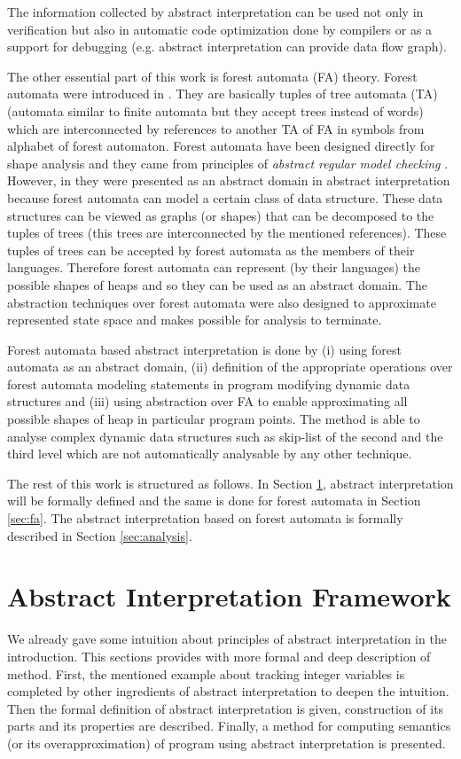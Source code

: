 \documentclass[a4paper, 12pt]{article}
\begin{document}
The information collected by abstract interpretation can be used not only
in verification but also in automatic code optimization done by compilers
or as a support for debugging (e.g. abstract interpretation can provide data flow graph).

The other essential part of this work is forest automata (FA) theory.
Forest automata were introduced in \cite{cav11}.
They are basically tuples of tree automata (TA) (automata similar to finite automata
but they accept trees instead of words) which are interconnected
by references to another TA of FA in symbols from alphabet of forest automaton.
Forest automata have been designed directly for shape analysis and
they came from principles of \emph{abstract regular model checking} \cite{artmc}.
However, in \cite{atva13} they were presented as an abstract domain in abstract interpretation
because forest automata can model a certain class of data structure.
These data structures can be viewed as graphs (or shapes) that can be decomposed to the tuples
of trees (this trees are interconnected by the mentioned references).
These tuples of trees can be accepted by forest automata as the members of their languages.
Therefore forest automata can represent (by their languages) the possible shapes of heaps
and so they can be used as an abstract domain.
The abstraction techniques over forest automata were also designed
to approximate represented state space and makes possible for analysis to terminate.

Forest automata based abstract interpretation is done by (i) using
forest automata as an abstract domain, (ii) definition of the appropriate
operations over forest automata modeling statements in program
modifying dynamic data structures and (iii) using abstraction over FA
to enable approximating all possible shapes of heap in particular
program points.
The method is able to analyse complex dynamic data structures
such as skip-list of the second and the third level which are not
automatically analysable by any other technique.

The rest of this work is structured as follows.
In Section \ref{sec:aif}, abstract interpretation will
be formally defined and the same is done for forest automata
in Section \ref{sec:fa}.
The abstract interpretation based on forest automata is formally
described in Section \ref{sec:analysis}.

\section{Abstract Interpretation Framework}
\label{sec:aif}
We already gave some intuition about principles of abstract interpretation in the introduction.
This sections provides with more formal and deep description of method.
First, the mentioned example about tracking integer variables is completed by
other ingredients of abstract interpretation to deepen the intuition.
Then the formal definition of abstract interpretation is given, construction of its parts
and its properties are described.
Finally, a method for computing semantics (or its overapproximation) of program
using abstract interpretation is presented.
\end{document}

